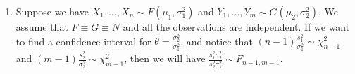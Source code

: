\documentclass[15pt,a4paper]{book}
\theoremstyle{definition}
\begin{document}
\begin{enumerate}
    \item Suppose we have $X_{1},\ldots,X_{n} \sim F(\mu_{1},\sigma_{1}^{2})$ and $Y_{1},\ldots,Y_{m} \sim G(\mu_{2},\sigma_{2}^{2})$. We assume that $F \equiv G \equiv N$ and all the observations are independent. If we want to find a confidence interval for $\theta = \frac{\sigma_{2}^{2}}{\sigma_{1}^{2}}$, and notice that $(n-1)\frac{s_{1}^{2}}{\sigma_{1}^{2}} \sim \chi_{n-1}^{2}$ and $(m-1)\frac{s_{2}^{2}}{\sigma_{2}^{2}} \sim \chi_{m-1}^{2}$, then we will have $\frac{s_{1}^{2}\sigma_{2}^{2}}{s_{2}^{2}\sigma_{1}^{2}} \sim F_{n-1,m-1}$.
\end{enumerate}



\end{document}
